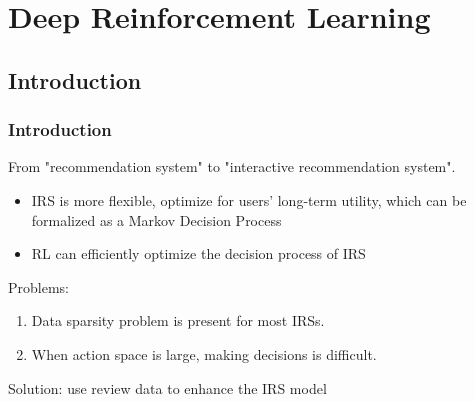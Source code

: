 \documentclass{../presentation}
\begin{document}
    \section{Deep Reinforcement Learning \cite{liu2022redrl}}

    \subsection{Introduction}
    \begin{frame}
        \frametitle{Introduction}

        From "recommendation system" to "interactive recommendation system".

        \begin{itemize}
            \item IRS is more flexible, optimize for users' long-term utility, which can be formalized as a Markov Decision Process
            \item RL can efficiently optimize the decision process of IRS
        \end{itemize}

        Problems:

        \begin{enumerate}
            \item Data sparsity problem is present for most IRSs.
            \item When action space is large, making decisions is difficult.
        \end{enumerate}

        Solution: use review data to enhance the IRS model

    \end{frame}
\end{document}
